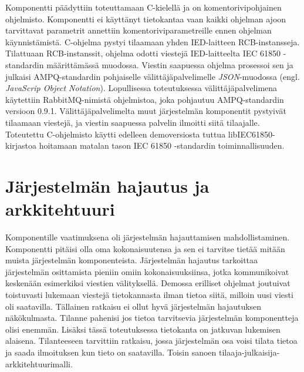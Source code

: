 Komponentti päädyttiin toteuttamaan C-kielellä ja on komentorivipohjainen ohjelmisto. Komponentti ei käyttänyt tietokantaa vaan kaikki ohjelman ajoon tarvittavat parametrit annettiin komentoriviparametreille ennen ohjelman käynnistämistä. C-ohjelma pystyi tilaamaan yhden IED-laitteen RCB-instansseja. Tilattuaan RCB-instanssit, ohjelma odotti viestejä IED-laitteelta IEC 61850 -standardin määrittämässä muodossa. Viestin saapuessa ohjelma prosessoi sen ja julkaisi AMPQ-standardin pohjaiselle välittäjäpalvelimelle \emph{JSON}-muodossa (engl. \emph{JavaScrip Object Notation}). Lopullisessa toteutuksessa välittäjäpalvelimena käytettiin RabbitMQ-nimistä ohjelmistoa, joka pohjautuu AMPQ-standardin versioon 0.9.1. Välittäjäpalvelimelta muut järjestelmän komponentit pystyivät tilaamaan viestejä, ja viestin saapuessa palvelin ilmoitti siitä tilaajalle. Toteutettu C-ohjelmisto käytti edelleen demoversiosta tuttua libIEC61850-kirjastoa hoitamaan matalan tason IEC 61850 -standardin toiminnallisuuden.


\section{Järjestelmän hajautus ja arkkitehtuuri}
\label{ch:järjestelmän-hajautus-ja-arkkitehtuuri}
Komponentille vaatimuksena oli järjestelmän hajauttamisen mahdollistaminen. Komponentti pitäisi olla oma kokonaisuutensa ja sen ei tarvitse tietää mitään muista järjestelmän komponenteista.  Järjestelmän hajautus tarkoittaa järjestelmän osittamista pieniin omiin kokonaisuuksiinsa, jotka kommunikoivat keskenään esimerkiksi viestien välityksellä. Demossa erilliset ohjelmat joutuivat toistuvasti lukemaan viestejä tietokannasta ilman tietoa siitä, milloin uusi viesti oli saatavilla. Tällainen ratkaisu ei ollut hyvä järjestelmän hajautuksen näkökulmasta. Tilanne pahenisi jos tietoa tarvitsevia järjestelmän komponentteja olisi enemmän. Lisäksi tässä toteutuksessa tietokanta on jatkuvan lukemisen alaisena. Tilanteeseen tarvittiin ratkaisu, jossa järjestelmän osa voisi tilata tietoa ja saada ilmoituksen kun tieto on saatavilla. Toisin sanoen tilaaja-julkaisija-arkkitehtuurimalli.

